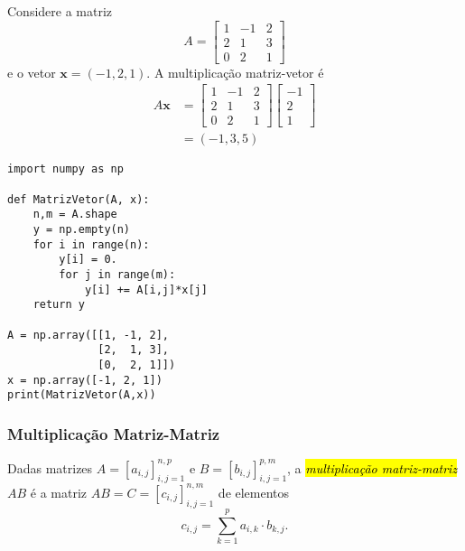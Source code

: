 \begin{ex}
  Considere a matriz
  \begin{equation}
    A =
    \begin{bmatrix}
      1 & -1 & 2\\
      2 & 1 & 3\\
      0 & 2 & 1
    \end{bmatrix}
  \end{equation}
  e o vetor $\pmb{x} = (-1, 2, 1)$. A multiplicação matriz-vetor é
  \begin{subequations}
    \begin{align}
      A\pmb{x} &= \begin{bmatrix}
        1 & -1 & 2\\
        2 & 1 & 3\\
        0 & 2 & 1
      \end{bmatrix}
      \begin{bmatrix}
        -1\\
        2\\
        1
      \end{bmatrix}\\
               &= (-1, 3, 5)
    \end{align}
   \end{subequations}

\begin{lstlisting}
import numpy as np

def MatrizVetor(A, x):
    n,m = A.shape
    y = np.empty(n)
    for i in range(n):
        y[i] = 0.
        for j in range(m):
            y[i] += A[i,j]*x[j]
    return y

A = np.array([[1, -1, 2],
              [2,  1, 3],
              [0,  2, 1]])
x = np.array([-1, 2, 1])
print(MatrizVetor(A,x))
\end{lstlisting}
\end{ex}

\subsubsection{Multiplicação Matriz-Matriz}

Dadas matrizes $A = [a_{i,j}]_{i,j=1}^{n,p}$ e $B = [b_{i,j}]_{i,j=1}^{p,m}$, a \hl{\emph{multiplicação matriz-matriz}} $AB$ é a matriz $AB = C = [c_{i,j}]_{i,j=1}^{n,m}$ de elementos
\begin{equation}
  c_{i,j} = \sum_{k=1}^{p} a_{i,k}\cdot b_{k,j}.
\end{equation}

